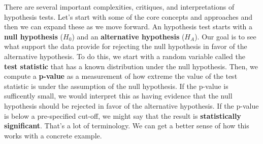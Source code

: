 \documentclass[12pt]{article}
\begin{document}
There are several important complexities, critiques, and interpretations of
hypothesis tests. Let's start with some of the core concepts and approaches
and then we can expand these as we move forward. An hypothesis test starts
with a \textbf{null hypothesis} ($H_0$) and an \textbf{alternative hypothesis}
($H_A$). Our goal is to see what support the data provide for rejecting the
null hypothesis in favor of the alternative hypothesis. To do this, we start
with a random variable called the \textbf{test statistic} that has a known
distribution under the null hypothesis. Then, we compute a \textbf{p-value}
as a measurement of how extreme the value of the test statistic is under 
the assumption of the null hypothesis. If the p-value is sufficently small,
we would interpret this as having evidence that the null hypothesis should 
be rejected in favor of the alternative hypothesis. If the p-value is below
a pre-specified cut-off, we might say that the result is
\textbf{statistically significant}. That's a lot of terminology. We can get
a better sense of how this works with a concrete example.

\newpage

\end{document}
